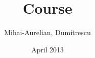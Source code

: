 \documentclass[11pt]{article}
\begin{document}
\title{Course}

\author{Mihai-Aurelian, Dumitrescu}

\date{April 2013}
\end{document}
